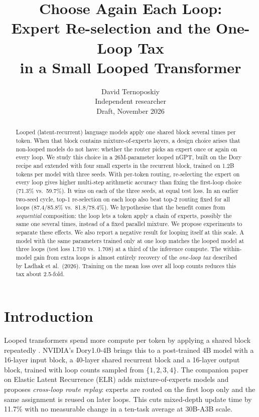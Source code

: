 \documentclass[11pt]{article}
\title{\textbf{Choose Again Each Loop:\\Expert Re-selection and the One-Loop Tax\\in a Small Looped Transformer}}
\author{David Ternoposkiy\\Independent researcher\\\small Draft, November 2026}
\date{}
\begin{document}
\maketitle

\begin{abstract}
Looped (latent-recurrent) language models apply one shared block several times per token. When that block contains mixture-of-experts layers, a design choice arises that non-looped models do not have: whether the router picks an expert once or again on every loop. We study this choice in a 26M-parameter looped nGPT, built on the Dory recipe and extended with four small experts in the recurrent block, trained on 1.2B tokens per model with three seeds. With per-token routing, re-selecting the expert on every loop gives higher multi-step arithmetic accuracy than fixing the first-loop choice (71.3\% vs.\ 59.7\%). It wins on each of the three seeds, at equal test loss. In an earlier two-seed cycle, top-1 re-selection on each loop also beat top-2 routing fixed for all loops (87.4/85.8\% vs.\ 81.8/78.4\%). We hypothesise that the benefit comes from \emph{sequential} composition: the loop lets a token apply a chain of experts, possibly the same one several times, instead of a fixed parallel mixture. We propose experiments to separate these effects. We also report a negative result for looping itself at this scale. A model with the same parameters trained only at one loop matches the looped model at three loops (test loss 1.710 vs.\ 1.708) at a third of the inference compute. The within-model gain from extra loops is almost entirely recovery of the \emph{one-loop tax} described by Ladhak et al.\ (2026). Training on the mean loss over all loop counts reduces this tax about 2.5-fold.
\end{abstract}

\section{Introduction}
Looped transformers spend more compute per token by applying a shared block repeatedly \cite{dehghani2019,saunshi2025,geiping2025,zhu2025}. NVIDIA's Dory1.0-4B \cite{dory} brings this to a post-trained 4B model with a 16-layer input block, a 40-layer shared recurrent block and a 16-layer output block, trained with loop counts sampled from $\{1,2,3,4\}$. The companion paper on Elastic Latent Recurrence (ELR) \cite{elr} adds mixture-of-experts models and proposes \emph{cross-loop route replay}: experts are routed on the first loop only and the same assignment is reused on later loops. This cuts mixed-depth update time by 11.7\% with no measurable change in a ten-task average at 30B-A3B scale.
\end{document}
